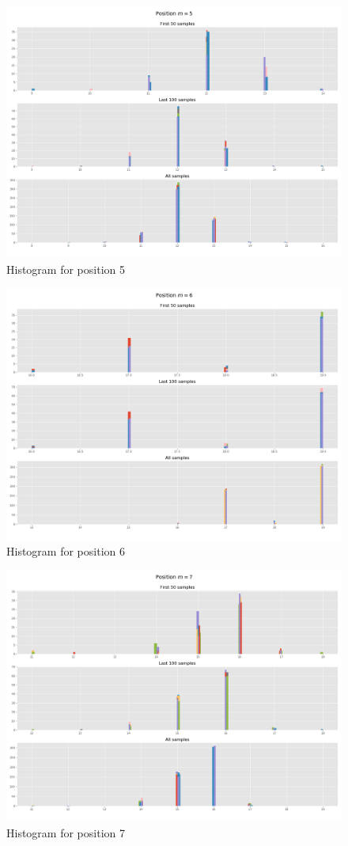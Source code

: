 \documentclass[]{article}
\begin{document}
\begin{figure}[H]
	\begin{center}
		
		\includegraphics[width=.5\textwidth]{task4/figures/T_2_4/Q2/distribution_pos5.png}
		\caption*{Histogram for position 5}
	\end{center}
\end{figure}

\begin{figure}[H]
	\begin{center}
		
		\includegraphics[width=.5\textwidth]{task4/figures/T_2_4/Q2/distribution_pos6.png}
		\caption*{Histogram for position 6}
	\end{center}
\end{figure}

\begin{figure}[H]
	\begin{center}
		
		\includegraphics[width=.5\textwidth]{task4/figures/T_2_4/Q2/distribution_pos7.png}
		\caption*{Histogram for position 7}
	\end{center}
\end{figure}
\end{document}
